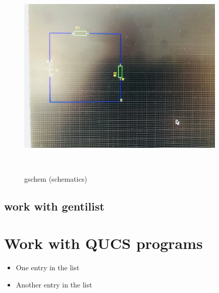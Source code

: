 \documentclass{report}
\begin{document}
\begin{figure}[!tb]
 \begin{center}

\includegraphics[width=10cm,height=10cm,keepaspectratio]{011.jpg}

\caption{gschem (schematics)}
\label{fig:figure 1}
\end{center}
\end{figure}

\subsection{work with gentilist}






\section{Work with QUCS programs}
\begin{itemize}
  \item One entry in the list
  \item Another entry in the list
\end{itemize}
\end{document}
